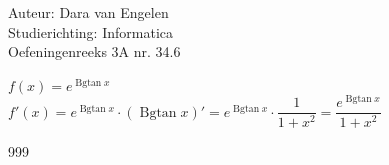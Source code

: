 \documentclass[a4paper]{article}
\begin{document}
  
\noindent \large Auteur: Dara van Engelen\\
\noindent \large Studierichting: Informatica\\
\noindent \large Oefeningenreeks 3A nr. 34.6\\

\medskip

\normalsize

$f(x) = e^{\operatorname{Bgtan}x}$\\

$f'(x) = e^{\operatorname{Bgtan}x} \cdot (\operatorname{Bgtan}x)' = e^{\operatorname{Bgtan}x} \cdot \dfrac{1}{1+x^2} = \dfrac{e^{\operatorname{Bgtan}x}}{1 + x^2}$\\


\begin{thebibliography}{999}
\end{thebibliography}
\end{document}
